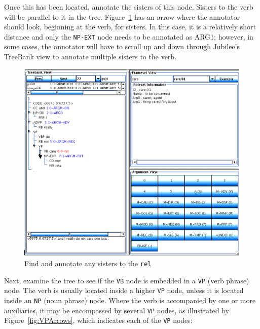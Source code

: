 \documentclass[11pt]{report}
\begin{document}
Once this has been located, annotate the sisters of this node.  Sisters to the verb will be parallel to it in the tree.  Figure~\ref{fig:sisterArrow} has an arrow where the annotator should look, beginning at the verb, for sisters.  In this case, it is a relatively short distance and only the \texttt{NP-EXT} node needs to be annotated as ARG1; however, in some cases, the annotator will have to scroll up and down through Jubilee's TreeBank view to annotate multiple sisters to the verb. 

\begin{figure}[htbp]
\centering
\includegraphics[scale=0.4]{img/sisterArrow.png}
\caption{Find and annotate any sisters to the \texttt{rel}}
\label{fig:sisterArrow}
\end{figure}

Next, examine the tree to see if the \texttt{VB} node is embedded in a \texttt{VP} (verb phrase) node. The verb is usually located inside a higher \texttt{VP} node, unless it is located inside an \texttt{NP} (noun phrase) node.  Where the verb is accompanied by one or more auxiliaries, it may be encompassed by several \texttt{VP} nodes, as illustrated by Figure~\ref{fig:VPArrows}, which indicates each of the \texttt{VP} nodes: 
\end{document}
